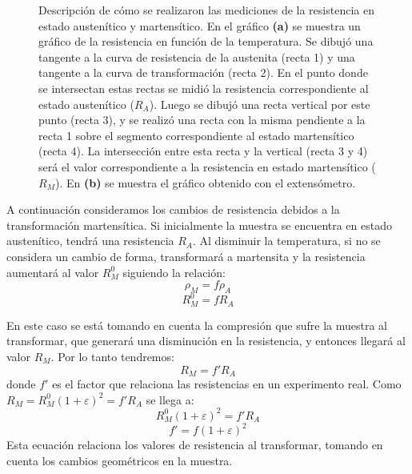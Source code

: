 \documentclass[a4paper,12pt,fleqn,twoside,openany]{book}
\begin{document}
\begin{figure}
    \caption{Descripción de cómo se realizaron las mediciones de la resistencia en estado austenítico y martensítico. En el gráfico \textbf{(a)} se muestra un gráfico de la resistencia en función de la temperatura. Se dibujó una tangente a la curva de resistencia de la austenita (recta 1) y una tangente a la curva de transformación (recta 2). En el punto donde se intersectan estas rectas se midió la resistencia correspondiente al estado austenítico ($R_A$). Luego se dibujó una recta vertical por este punto (recta 3), y se realizó una recta con la misma pendiente a la recta 1 sobre el segmento correspondiente al estado martensítico (recta 4). La intersección entre esta recta  y la vertical (recta 3 y 4) será el valor correspondiente a la resistencia en estado martensítico ($R_M$). En \textbf{(b)} se muestra el gráfico obtenido con el extensómetro.}
    \label{fig:ExpStrainRes}
    \end{figure}


A continuación consideramos los cambios de resistencia debidos a la transformación martensítica. Si inicialmente la muestra se encuentra en estado austenítico, tendrá una resistencia $R_A$. Al disminuir la temperatura, si no se considera un cambio de forma, transformará a martensita y la resistencia aumentará al valor $R_M ^0 $ siguiendo la relación: 
\begin{equation}
  \rho_M =f \rho_A
\end{equation}
\begin{equation}
 R_M^0 =fR_A   
\end{equation}

En este caso se está tomando en cuenta la compresión que sufre la muestra al transformar, que generará una disminución en la resistencia, y entonces llegará al valor ${R_M}$. Por lo tanto tendremos:
\begin{equation}
 {R_M}=f'R_A 
\end{equation}
donde $f'$ es el factor que relaciona las resistencias en un experimento real. Como $R_M=R_M^0 (1+\varepsilon)^2 = f' R_A$ se llega a:
\begin{equation}
 R_M^0 (1+\varepsilon)^2 = f'R_A
\end{equation}
\begin{equation}
f' = f (1+\varepsilon)^2  \label{fprima}
\end{equation}
Esta ecuación relaciona los valores de resistencia al transformar, tomando en cuenta los cambios geométricos en la muestra. 
\end{document}
